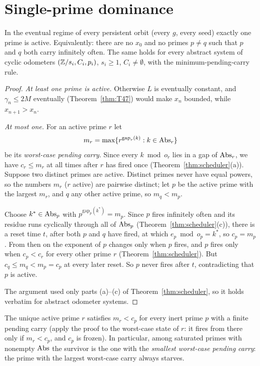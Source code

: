 \section{Single-prime dominance}

\begin{theorem}\label{thm:dominance}
In the eventual regime of every persistent orbit (every \(g\), every seed) exactly one prime is active. Equivalently: there are no \(x_0\) and no primes \(p\ne q\) such that \(p\) and \(q\) both carry infinitely often. The same holds for every abstract system of cyclic odometers \((\mathbb{Z}/s_i,C_i,p_i)\), \(s_i\ge1\), \(C_i\ne\emptyset\), with the minimum-pending-carry rule.
\end{theorem}
\begin{proof}
\emph{At least one prime is active.} Otherwise \(L\) is eventually constant, and \(\gamma_n\le2M\) eventually (Theorem~\ref{thm:T47}) would make \(x_n\) bounded, while \(x_{n+1}>x_n\).

\emph{At most one.} For an active prime \(r\) let
\[
m_r=\max\{r^{\mathrm{gap}_r(k)}:k\in\operatorname{Abs}_r\}
\]
be its \emph{worst-case pending carry}. Since every \(k\bmod o_r\) lies in a gap of \(\operatorname{Abs}_r\), we have \(c_r\le m_r\) at all times after \(r\) has fired once (Theorem~\ref{thm:scheduler}(a)). Suppose two distinct primes are active. Distinct primes never have equal powers, so the numbers \(m_r\) (\(r\) active) are pairwise distinct; let \(p\) be the active prime with the largest \(m_r\), and \(q\) any other active prime, so \(m_q<m_p\).

Choose \(k^\ast\in\operatorname{Abs}_p\) with \(p^{\mathrm{gap}_p(k^\ast)}=m_p\). Since \(p\) fires infinitely often and its residue runs cyclically through all of \(\operatorname{Abs}_p\) (Theorem~\ref{thm:scheduler}(c)), there is a reset time \(t\), after both \(p\) and \(q\) have fired, at which \(e_p\bmod o_p=k^\ast\), so \(c_p=m_p\). From then on the exponent of \(p\) changes only when \(p\) fires, and \(p\) fires only when \(c_p<c_r\) for every other prime \(r\) (Theorem~\ref{thm:scheduler}). But \(c_q\le m_q<m_p=c_p\) at every later reset. So \(p\) never fires after \(t\), contradicting that \(p\) is active.

The argument used only parts (a)--(c) of Theorem~\ref{thm:scheduler}, so it holds verbatim for abstract odometer systems.
\end{proof}

\begin{corollary}\label{cor:starve}
The unique active prime \(r\) satisfies \(m_r<c_p\) for every inert prime \(p\) with a finite pending carry (apply the proof to the worst-case state of \(r\): it fires from there only if \(m_r<c_p\), and \(c_p\) is frozen). In particular, among saturated primes with nonempty \(\operatorname{Abs}\) the survivor is the one with the \emph{smallest worst-case pending carry}: the prime with the largest worst-case carry always starves.
\end{corollary}

